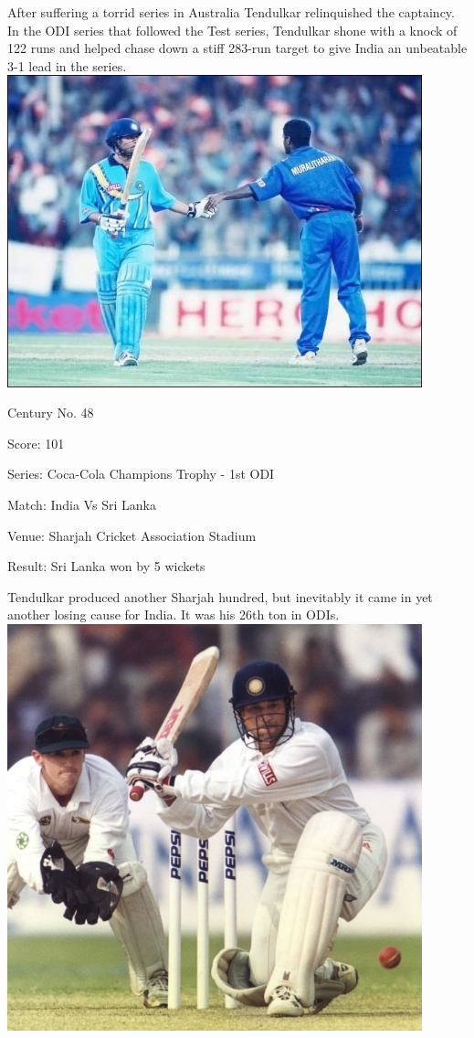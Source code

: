 \documentclass[11pt, a4paper]{article}
\begin{document}
After suffering a torrid series in Australia Tendulkar relinquished the captaincy. In the ODI series that followed the Test series, Tendulkar shone with a knock of 122 runs and helped chase down a stiff 
283-run target to give India an unbeatable 3-1 lead in the series.
\newpage
\includegraphics[width=0.9\textwidth]{pics/48.jpg}

Century No. 48 

Score: 101 

Series: Coca-Cola Champions Trophy - 1st ODI 

Match: India Vs Sri Lanka 

Venue: Sharjah Cricket Association Stadium 

Result: Sri Lanka won by 5 wickets 

Tendulkar produced another Sharjah hundred, but inevitably it came in yet another losing cause for India. It was his 26th ton in ODIs.
\newpage
\includegraphics[width=0.9\textwidth]{pics/49.jpg}
\end{document}
